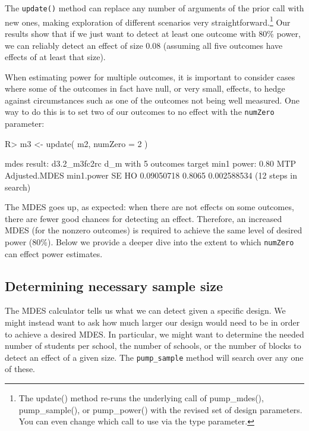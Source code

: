 \documentclass[
]{jss}
\begin{document}
The \texttt{update()} method can replace any number of arguments of the
prior call with new ones, making exploration of different scenarios very
straightforward.\footnote{The update() method re-runs the underlying
  call of pump\_mdes(), pump\_sample(), or pump\_power() with the
  revised set of design parameters. You can even change which call to
  use via the type parameter.} Our results show that if we just want to
detect at least one outcome with 80\% power, we can reliably detect an
effect of size \(0.08\) (assuming all five outcomes have effects of at
least that size).

When estimating power for multiple outcomes, it is important to consider
cases where some of the outcomes in fact have null, or very small,
effects, to hedge against circumstances such as one of the outcomes not
being well measured. One way to do this is to set two of our outcomes to
no effect with the \texttt{numZero} parameter:

\begin{CodeChunk}
\begin{CodeInput}
R> m3 <- update( m2, numZero = 2 )
\end{CodeInput}
\end{CodeChunk}

\begin{CodeChunk}
\begin{CodeOutput}
mdes result: d3.2_m3fc2rc d_m with 5 outcomes
  target min1 power: 0.80
 MTP Adjusted.MDES min1.power          SE
  HO    0.09050718     0.8065 0.002588534
    (12 steps in search)
\end{CodeOutput}
\end{CodeChunk}

The MDES goes up, as expected: when there are not effects on some
outcomes, there are fewer good chances for detecting an effect.
Therefore, an increased MDES (for the nonzero outcomes) is required to
achieve the same level of desired power (80\%). Below we provide a
deeper dive into the extent to which \texttt{numZero} can effect power
estimates.

\subsection{Determining necessary sample size}

The MDES calculator tells us what we can detect given a specific design.
We might instead want to ask how much larger our design would need to be
in order to achieve a desired MDES. In particular, we might want to
determine the needed number of students per school, the number of
schools, or the number of blocks to detect an effect of a given size.
The \texttt{pump\_sample} method will search over any one of these.
\end{document}
